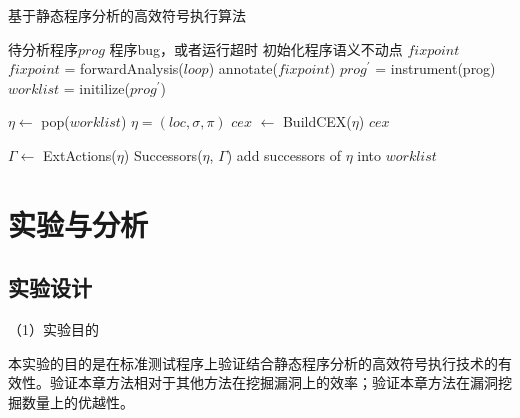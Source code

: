 \begin{algorithm}[h]
\renewcommand{\algorithmicrequire}{\textbf{Input:}}
\renewcommand{\algorithmicensure}{\textbf{Output:}}
\caption{基于静态程序分析的高效符号执行算法}
\label{algo-absint-symexe}
\begin{algorithmic}[1]
\REQUIRE 待分析程序$prog$
\ENSURE 程序bug，或者运行超时
\STATE 初始化程序语义不动点 $fixpoint$
	\STATE $fixpoint$ = forwardAnalysis($loop$)
	\STATE annotate($fixpoint$)
\ENDFOR
\STATE $prog^{'}$ = instrument(prog)
\STATE $worklist$ = initilize($prog^{'}$)

{}
	\STATE $\eta \gets $ pop($worklist$)
		\STATE $\eta = (loc, \sigma, \pi)$
			\STATE $\mathit{cex}$ $\gets$ BuildCEX($\eta$)
			\RETURN $\mathit{cex}$
		\ENDIF
	
	\ELSE
		\STATE $\Gamma \gets $ ExtActions($\eta$)
		\STATE Successors($\eta$, $\Gamma$)
		\STATE add successors of $\eta$ into $worklist$
	\ENDIF
\ENDWHILE
\end{algorithmic}
\end{algorithm}


%



\section{实验与分析}
\label{sec-experiment}

\subsection{实验设计}

（1）实验目的

本实验的目的是在标准测试程序上验证结合静态程序分析的高效符号执行技术的有效性。验证本章方法相对于其他方法在挖掘漏洞上的效率；验证本章方法在漏洞挖掘数量上的优越性。

